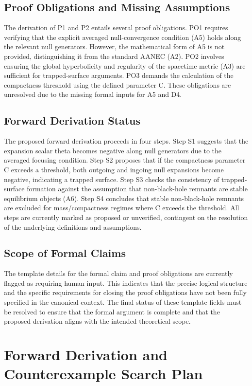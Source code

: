 \documentclass[conference]{IEEEtran}
\begin{document}
\subsection{Proof Obligations and Missing Assumptions}
The derivation of P1 and P2 entails several proof obligations. PO1 requires verifying that the explicit averaged null-convergence condition (A5) holds along the relevant null generators. However, the mathematical form of A5 is not provided, distinguishing it from the standard AANEC (A2). PO2 involves ensuring the global hyperbolicity and regularity of the spacetime metric (A3) are sufficient for trapped-surface arguments. PO3 demands the calculation of the compactness threshold using the defined parameter C. These obligations are unresolved due to the missing formal inputs for A5 and D4.

\subsection{Forward Derivation Status}
The proposed forward derivation proceeds in four steps. Step S1 suggests that the expansion scalar theta becomes negative along null generators due to the averaged focusing condition. Step S2 proposes that if the compactness parameter C exceeds a threshold, both outgoing and ingoing null expansions become negative, indicating a trapped surface. Step S3 checks the consistency of trapped-surface formation against the assumption that non-black-hole remnants are stable equilibrium objects (A6). Step S4 concludes that stable non-black-hole remnants are excluded for mass/compactness regimes where C exceeds the threshold. All steps are currently marked as proposed or unverified, contingent on the resolution of the underlying definitions and assumptions.

\subsection{Scope of Formal Claims}
The template details for the formal claim and proof obligations are currently flagged as requiring human input. This indicates that the precise logical structure and the specific requirements for closing the proof obligations have not been fully specified in the canonical context. The final status of these template fields must be resolved to ensure that the formal argument is complete and that the proposed derivation aligns with the intended theoretical scope.

\section{Forward Derivation and Counterexample Search Plan}
\end{document}
